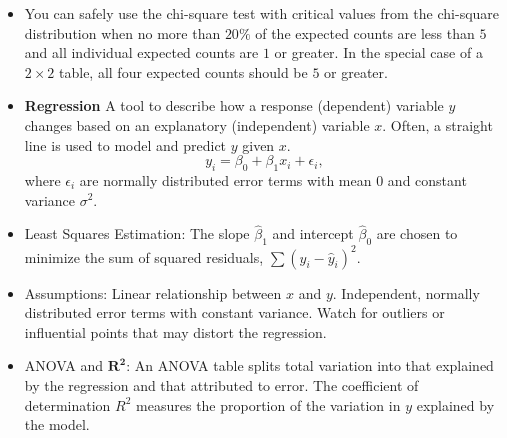 \documentclass[twoside]{article}
\newcommand{\0}{\mathbf{0}}
\begin{document}
\begin{itemize}
\item You can safely use the chi-square test with critical values from the chi-square distribution when no more than $20\%$ of the expected counts are less than $5$ and all individual expected counts are $1$ or greater. In the special case of a $2 \times 2$ table, all four expected counts should be $5$ or greater.
\item \textbf{Regression}\dotfill
\subitem A tool to describe how a response (dependent) variable \(y\) changes based on an explanatory (independent) variable \(x\). Often, a straight line is used to model and predict \(y\) given \(x\).
$$y_i = \beta_0 + \beta_1 x_i + \epsilon_i,$$
where \(\epsilon_i\) are normally distributed error terms with mean 0 and constant variance \(\sigma^2\).
\item Least Squares Estimation: 
\subitem The slope \(\hat{\beta}_1\) and intercept \(\hat{\beta}_0\) are chosen to minimize the sum of squared residuals, \(\sum (y_i - \hat{y}_i)^2\).
\item Assumptions:
\subitem Linear relationship between \(x\) and \(y\).
\subitem Independent, normally distributed error terms with constant variance.
\subitem Watch for outliers or influential points that may distort the regression.

\newpage

\item ANOVA and \(\boldsymbol{R^2}\):
\subitem An ANOVA table splits total variation into that explained by the regression and that attributed to error. The coefficient of determination \(R^2\) measures the proportion of the variation in \(y\) explained by the model.


\end{itemize}
\end{document}
